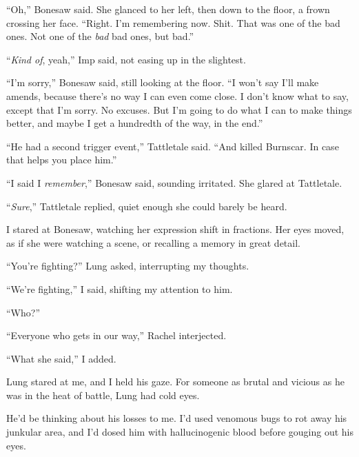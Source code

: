 ``Oh,'' Bonesaw said.  She glanced to her left, then down to the floor, a frown crossing her face.  ``Right.  I'm remembering now.  Shit.  That was one of the bad ones.  Not one of the \emph{bad} bad ones, but bad.''



``\emph{Kind of}, yeah,'' Imp said, not easing up in the slightest.



``I'm sorry,'' Bonesaw said, still looking at the floor.  ``I won't say I'll make amends, because there's no way I can even come close.  I don't know what to say, except that I'm sorry.  No excuses.  But I'm going to do what I can to make things better, and maybe I get a hundredth of the way, in the end.''



``He had a second trigger event,'' Tattletale said.  ``And killed Burnscar.  In case that helps you place him.''



``I said I \emph{remember},'' Bonesaw said, sounding irritated.  She glared at Tattletale.



``\emph{Sure},'' Tattletale replied, quiet enough she could barely be heard.



I stared at Bonesaw, watching her expression shift in fractions.  Her eyes moved, as if she were watching a scene, or recalling a memory in great detail.



``You're fighting?'' Lung asked, interrupting my thoughts.



``We're fighting,'' I said, shifting my attention to him.



``Who?''



``Everyone who gets in our way,'' Rachel interjected.



``What she said,'' I added.



Lung stared at me, and I held his gaze.  For someone as brutal and vicious as he was in the heat of battle, Lung had cold eyes.



He'd be thinking about his losses to me.  I'd used venomous bugs to rot away his junkular area, and I'd dosed him with hallucinogenic blood before gouging out his eyes.



